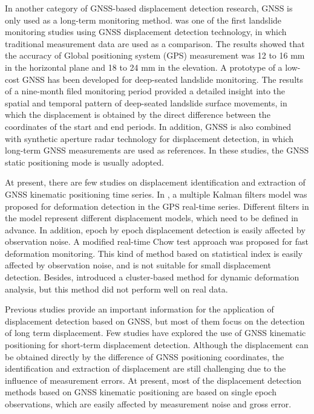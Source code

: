 \documentclass{svjour3}                     %
\begin{document}
In another category of GNSS-based displacement detection research, GNSS is only used as a long-term monitoring method.
\cite{gili2000using} was one of the first landslide monitoring studies using GNSS displacement detection technology, in which traditional measurement data are used as a comparison. The results showed that the accuracy of Global positioning system (GPS) measurement was 12 to 16 mm in the horizontal plane and 18 to 24 mm in the elevation.
A prototype of a low-cost GNSS has been developed for deep-seated landslide monitoring\citep{rs12203375}. The results of a nine-month filed monitoring period provided a detailed insight into the spatial and temporal pattern of deep-seated landslide surface movements, in which the displacement is obtained by the direct difference between the coordinates of the start and end periods.
In addition, GNSS is also combined with synthetic aperture radar technology for displacement detection, in which long-term GNSS measurements are used as references\citep{atanasova2018ground,fuhrmann2015estimation}.
In these studies, the GNSS static positioning mode is usually adopted.

At present, there are few studies on displacement identification and extraction of GNSS kinematic positioning time series. In \cite{li2010deformation}, a multiple Kalman filters model was proposed for deformation detection in the GPS real-time series. Different filters in the model represent different displacement models, which need to be defined in advance. In addition, epoch by epoch displacement detection is easily affected by observation noise.
A modified real-time Chow test approach was proposed for fast deformation monitoring\citep{bellone2016real}. This kind of method based on statistical index is easily affected by observation noise, and is not suitable for small displacement detection\citep{pirotti2015micro}. Besides, \cite{dabove2016fast} introduced a cluster-based method for dynamic deformation analysis, but this method did not perform well on real data.

Previous studies provide an important information for the application of displacement detection based on GNSS, but most of them focus on the detection of long term displacement. Few studies have explored the use of GNSS kinematic positioning for short-term displacement detection. Although the displacement can be obtained directly by the difference of GNSS positioning coordinates, the identification and extraction of displacement are still challenging due to the influence of measurement errors.
At present, most of the displacement detection methods based on GNSS kinematic positioning are based on single epoch observations, which are easily affected by measurement noise and gross error.
\end{document}
